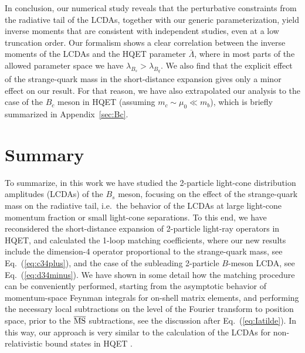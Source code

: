 \documentclass[a4paper,11pt]{article}
\begin{document}
In conclusion, our numerical study reveals that the perturbative constraints from the radiative tail of the LCDAs, 
together with our generic parameterization, yield inverse moments that are consistent with independent studies, 
even at a low truncation order. 
Our formalism shows a clear correlation between the inverse moments of the LCDAs and the HQET parameter $\bar\Lambda$, 
where in most parts of the allowed parameter space we have $\lambda_{B_s}>\lambda_{B_q}$. We also find that the explicit effect of the
strange-quark mass in the short-distance expansion gives only a minor effect on our result. For that reason, we have also
extrapolated our analysis to the case of the $B_c$ meson in HQET (assuming $m_c \sim \mu_0 \ll m_b$), which
is briefly summarized in Appendix~\ref{sec:Bc}.


\clearpage 


\section{Summary}

To summarize, in this work we have studied the 2-particle light-cone distribution amplitudes (LCDAs) of the $B_s$ meson, focusing on the effect
of the strange-quark mass on the radiative tail, i.e.\ the behavior of the LCDAs at large light-cone momentum fraction 
or small light-cone separations. To this end, we have reconsidered the short-distance expansion of 2-particle
light-ray operators in HQET, and calculated the 1-loop matching coefficients, 
where our new results include the dimension-4 operator proportional to the strange-quark mass, see Eq.~(\ref{eq:c34plus}), and 
the case of the subleading 2-particle $B$-meson LCDA, see Eq.~(\ref{eq:d34minus}).
%
We have shown in some detail how the matching procedure can be conveniently performed, starting from the asymptotic behavior of 
momentum-space Feynman integrals for on-shell matrix elements, 
and performing the necessary local subtractions on the level of the Fourier transform to position space, 
prior to the $\overline{\rm MS}$ subtractions, see the discussion after Eq.~(\ref{eq:Iatilde}). 
%
In this way, our approach is very similar to the calculation of the LCDAs for non-relativistic bound states in HQET \cite{Bell:2008er}.
%
\end{document}
